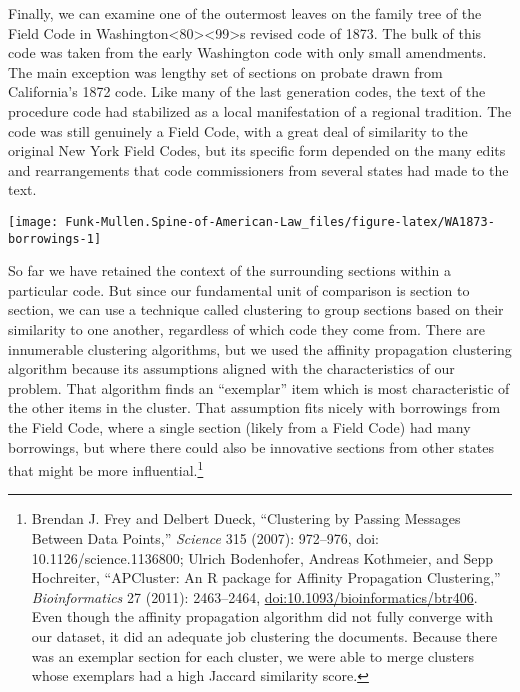 \documentclass[12pt,]{article}
\let\rmarkdownfootnote\footnote%
\def\footnote{\protect\rmarkdownfootnote}
\begin{document}
Finally, we can examine one of the outermost leaves on the family tree
of the Field Code in
Washington\textless80\textgreater\textless99\textgreater s revised code
of 1873. The bulk of this code was taken from the early Washington code
with only small amendments. The main exception was lengthy set of
sections on probate drawn from California's 1872 code. Like many of the
last generation codes, the text of the procedure code had stabilized as
a local manifestation of a regional tradition. The code was still
genuinely a Field Code, with a great deal of similarity to the original
New York Field Codes, but its specific form depended on the many edits
and rearrangements that code commissioners from several states had made
to the text.

\begin{center}\texttt{[image: Funk-Mullen.Spine-of-American-Law\_files/figure-latex/WA1873-borrowings-1]} \end{center}

So far we have retained the context of the surrounding sections within a
particular code. But since our fundamental unit of comparison is section
to section, we can use a technique called clustering to group sections
based on their similarity to one another, regardless of which code they
come from. There are innumerable clustering algorithms, but we used the
affinity propagation clustering algorithm because its assumptions
aligned with the characteristics of our problem. That algorithm finds an
``exemplar'' item which is most characteristic of the other items in the
cluster. That assumption fits nicely with borrowings from the Field
Code, where a single section (likely from a Field Code) had many
borrowings, but where there could also be innovative sections from other
states that might be more influential.\footnote{Brendan J. Frey and
  Delbert Dueck, ``Clustering by Passing Messages Between Data Points,''
  \emph{Science} 315 (2007): 972--976, doi: 10.1126/science.1136800;
  Ulrich Bodenhofer, Andreas Kothmeier, and Sepp Hochreiter,
  ``APCluster: An R package for Affinity Propagation Clustering,''
  \emph{Bioinformatics} 27 (2011): 2463--2464,
  \url{doi:10.1093/bioinformatics/btr406}. Even though the affinity
  propagation algorithm did not fully converge with our dataset, it did
  an adequate job clustering the documents. Because there was an
  exemplar section for each cluster, we were able to merge clusters
  whose exemplars had a high Jaccard similarity score.}
\end{document}

